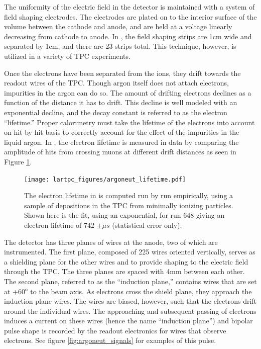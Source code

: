 The uniformity of the electric field in the \argoneut detector is maintained with a system of field shaping electrodes.  The electrodes are plated on to the interior surface of the volume between the cathode and anode, and are held at a voltage linearly decreasing from cathode to anode.  In \argoneut, the field shaping strips are 1cm wide and separated by 1cm, and there are 23 strips total.  This technique, however, is utilized in a variety of TPC experiments.

Once the electrons have been separated from the ions, they drift towards the readout wires of the TPC.  Though argon itself does not attach electrons, impurities in the argon can do so.  The amount of drifting electrons declines as a function of the distance it has to drift.  This decline is well modeled with an exponential decline, and the decay constant is referred to as the electron ``lifetime.'' Proper calorimetry must take the lifetime of the electrons into account on hit by hit basis to correctly account for the effect of the impurities in the liquid argon.  In \argoneut, the electron lifetime is measured in data by comparing the amplitude of hits from crossing muons at different drift distances as seen in Figure \ref{fig:argoneut_lifetime}.

\begin{figure}[htbp]
  \centering
  \texttt{[image: lartpc\_figures/argoneut\_lifetime.pdf]}
  \caption[\argoneut Lifetime Measurement]{The electron lifetime in \argoneut is computed run by run empirically, using a sample of depositions in the TPC from minimally ionizing particles.  Shown here is the fit, using an exponential, for run 648 giving an electron lifetime of 742 $\pm \mu s$ (statistical error only).}
  \label{fig:argoneut_lifetime}
\end{figure}



The \argoneut detector has three planes of wires at the anode, two of which are instrumented.  The first plane, composed of 225 wires oriented vertically, serves as a shielding plane for the other wires and to provide shaping to the electric field through the TPC.  The three planes are spaced with 4mm between each other.  The second plane, referred to as the ``induction plane,'' contains wires that are set at +60$^\text{o}$ to the beam axis.  As electrons cross the shield plane, they approach the induction plane wires.  The wires are biased, however, such that the electrons drift around the individual wires.  The approaching and subsequent passing of electrons induces a current on these wires (hence the name ``induction plane'') and bipolar pulse shape is recorded by the readout electronics for wires that observe electrons.  See figure \ref{fig:argoneut_signals} for examples of this pulse.

